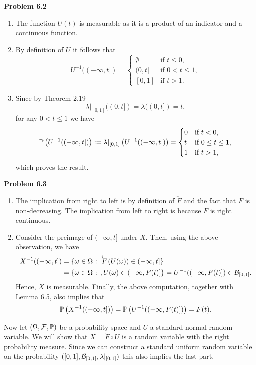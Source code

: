\bigskip

\textbf{Problem 6.2}
\begin{enumerate}[label=(\alph*)]
\item The function $U(t)$ is measurable as it is a product of an indicator and a continuous function.
\item By definition of $U$ it follows that
\[
	U^{-1}((-\infty,t]) = \begin{cases}
		\emptyset &\text{if } t \le 0,\\
		(0,t] &\text{if } 0 < t \le 1, \\
		[0,1] &\text{if } t > 1.
	\end{cases}
\]
\item Since by Theorem 2.19
\[
	\lambda|_{[0,1]}((0,t]) = \lambda((0,t]) = t,
\]
for any $0 < t \le 1$ we have
\[
	\mathbb P\left(U^{-1}((-\infty,t])\right) := \lambda|_{[0,1]}\left(U^{-1}((-\infty,t])\right)
	= \begin{cases}
		0 &\text{if } t < 0,\\
		t &\text{if } 0 \le t\le 1,\\
		1 &\text{if } t > 1,
	\end{cases}
\]
which proves the result.
\end{enumerate}

\bigskip

\textbf{Problem 6.3}
\begin{enumerate}[label=(\alph*)]
\item The implication from right to left is by definition of $\overleftarrow{F}$ and the fact that $F$ is non-decreasing. The implication from left to right is because $F$ is right continuous.
\item Consider the preimage of $(-\infty, t]$ under $X$. Then, using the above observation, we have
\begin{align*}
	X^{-1}((-\infty,t]) &= \{\omega \in \Omega \, : \, \overleftarrow{F}(U(\omega)) \in (-\infty,t]\}\\
	&= \{\omega \in \Omega \, :\ , U(\omega) \in (-\infty, F(t)]\} = U^{-1}((-\infty, F(t)]) \in \mathcal B_{[0,1]}.
\end{align*}
Hence, $X$ is measurable. Finally, the above computation, together with Lemma 6.5, also implies that
\[
	\mathbb P\left(X^{-1}((-\infty,t])\right) = \mathbb P\left(U^{-1}((-\infty, F(t)])\right) = F(t).
\]
\end{enumerate}


Now let $(\Omega,\mathcal F, \mathbb P)$ be a probability space and $U$ a standard normal random variable. We will show that $X = \overleftarrow{F} \circ U$ is a random variable with the right probability measure. Since we can construct a standard uniform random variable on the probability $([0,1], \mathcal B_{[0,1]}, \lambda|_{[0,1]})$ this also implies the last part. 


